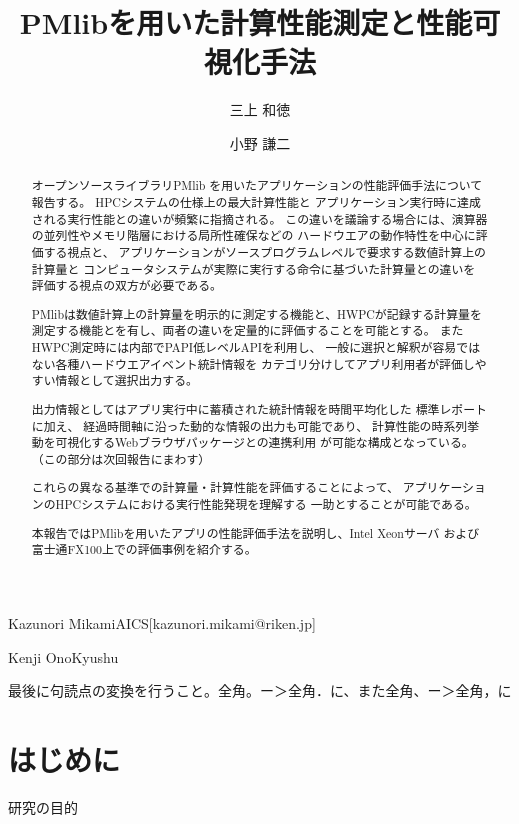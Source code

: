 \documentclass[submit,techrep,noauthor]{ipsj}
\begin{document}
\title{PMlibを用いた計算性能測定と性能可視化手法}


\author{三上 和徳}{Kazunori Mikami}{AICS}[kazunori.mikami@riken.jp]
\author{小野 謙二}{Kenji Ono}{Kyushu}

\begin{abstract}
オープンソースライブラリPMlib
を用いたアプリケーションの性能評価手法について報告する。
HPCシステムの仕様上の最大計算性能と
アプリケーション実行時に達成される実行性能との違いが頻繁に指摘される。
この違いを議論する場合には、演算器の並列性やメモリ階層における局所性確保などの
ハードウエアの動作特性を中心に評価する視点と、
アプリケーションがソースプログラムレベルで要求する数値計算上の計算量と
コンピュータシステムが実際に実行する命令に基づいた計算量との違いを
評価する視点の双方が必要である。

PMlibは数値計算上の計算量を明示的に測定する機能と、HWPCが記録する計算量を
測定する機能とを有し、両者の違いを定量的に評価することを可能とする。
またHWPC測定時には内部でPAPI低レベルAPIを利用し、
一般に選択と解釈が容易ではない各種ハードウエアイベント統計情報を
カテゴリ分けしてアプリ利用者が評価しやすい情報として選択出力する。

{ \color{blue}
出力情報としてはアプリ実行中に蓄積された統計情報を時間平均化した
標準レポートに加え、
経過時間軸に沿った動的な情報の出力も可能であり、
計算性能の時系列挙動を可視化するWebブラウザパッケージとの連携利用
が可能な構成となっている。（この部分は次回報告にまわす）
}

これらの異なる基準での計算量・計算性能を評価することによって、
アプリケーションのHPCシステムにおける実行性能発現を理解する
一助とすることが可能である。

本報告ではPMlibを用いたアプリの性能評価手法を説明し、Intel Xeonサーバ
および富士通FX100上での評価事例を紹介する。
\end{abstract}

\maketitle

{ \color{blue}
最後に句読点の変換を行うこと。全角。ー＞全角．に、また全角、ー＞全角，に\\
}

\section{はじめに}
研究の目的
\end{document}

